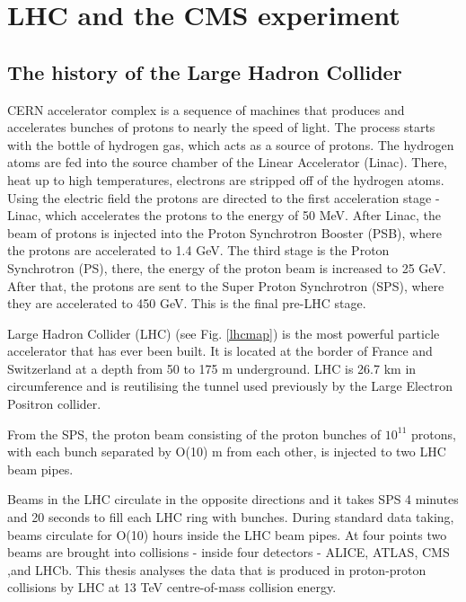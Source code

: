 
\chapter{LHC and the CMS experiment}
\label{ch:cms}

\section{The history of the Large Hadron Collider}\label{sec:cms_intro}

CERN accelerator complex is a sequence of machines that produces and accelerates bunches of protons to nearly the speed of light. The process starts with the bottle of hydrogen gas, which acts as a source of protons. The hydrogen atoms are fed into the source chamber of the Linear Accelerator (Linac). There, heat up to high temperatures, electrons are stripped off of the hydrogen atoms. Using the electric field the protons are directed to the first acceleration stage - Linac, which accelerates the protons to the energy of 50 MeV. After Linac, the beam of protons is injected into the Proton Synchrotron Booster (PSB), where the protons are accelerated to 1.4 GeV. The third stage is the Proton Synchrotron (PS), there, the energy of the proton beam is increased to 25 GeV. After that, the protons are sent to the Super Proton Synchrotron (SPS), where they are accelerated to 450 GeV. This is the final pre-LHC stage. 

Large Hadron Collider (LHC) (see Fig. \ref{lhcmap}) is the most powerful particle accelerator that has ever been built. It is located at the border of France and Switzerland at a depth from 50 to 175 m underground. LHC is 26.7 km in circumference and is reutilising the tunnel used previously by the Large Electron Positron collider. 




From the SPS, the proton beam consisting of the proton bunches of $10^11$ protons, with each bunch separated by O(10) m from each other, is injected to two LHC beam pipes. 


Beams in the LHC circulate in the opposite directions and it takes SPS 4 minutes and 20 seconds to fill each LHC ring with bunches. During standard data taking, beams circulate for O(10) hours inside the LHC beam pipes. At four points two beams are brought into collisions -  inside four detectors - ALICE, ATLAS, CMS ,and LHCb. This thesis analyses the data that is produced in proton-proton collisions by LHC at 13 TeV centre-of-mass collision energy.





